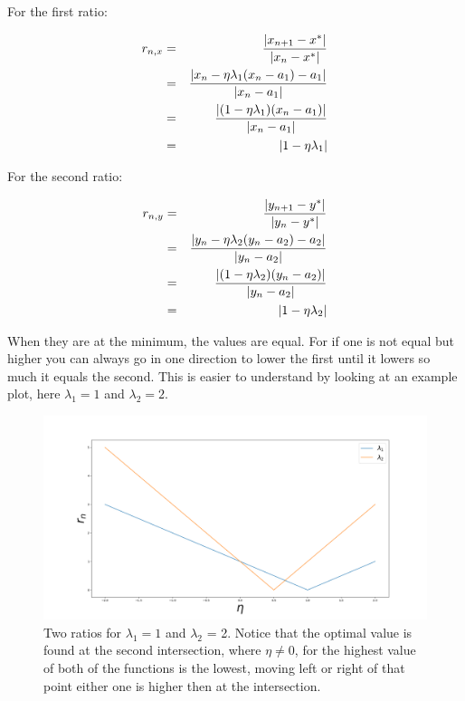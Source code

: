 \documentclass[a4paper]{article}
\begin{document}
For the first ratio:

\begin{eqnarray}
r_{n,x} &=& \frac{\abs{x_{n+1}- x^*}}{\abs{x_n - x^*}}\\
&=& \frac{\abs{x_n - \eta\lambda_1 (x_n-a_1) - a_1}}{\abs{x_n - a_1}}\\
&=& \frac{\abs{ (1- \eta \lambda_1) (x_n - a_1)}}{\abs{x_n - a_1}}\\
&=& \abs{1-\eta \lambda_1}
\end{eqnarray}

For the second ratio:

\begin{eqnarray}
r_{n,y} &=& \frac{\abs{y_{n+1}- y^*}}{\abs{y_n - y^*}}\\
&=& \frac{\abs{y_n - \eta\lambda_2 (y_n-a_2) - a_2}}{\abs{y_n - a_2}}\\
&=& \frac{\abs{ (1- \eta \lambda_2) (y_n - a_2)}}{\abs{y_n - a_2}}\\
&=& \abs{1-\eta \lambda_2}
\end{eqnarray}

When they are at the minimum, the values are equal. For if one is not equal but higher you can always go in one direction to lower the first until it lowers so much it equals the second. This is easier to understand by looking at an example plot, here $\lambda_1 = 1$ and $\lambda_2 = 2$.

\begin{figure}[H]
\includegraphics[width=\textwidth]{Images/32b.png}
\caption{Two ratios for $\lambda_1 = 1$ and $\lambda_2$ = 2. Notice that the optimal value is found at the second intersection, where $\eta \neq 0$, for the highest value of both of the functions is the lowest, moving left or right of that point either one is higher then at the intersection.}
\label{Converg}
\end{figure}
\end{document}
